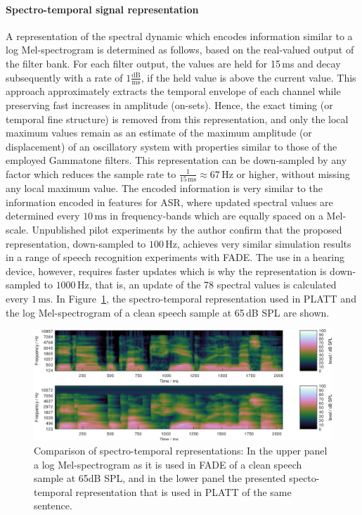 \documentclass[10pt,a4paper,twocolumn]{article}
\begin{document}
\paragraph{Spectro-temporal signal representation}
%
A representation of the spectral dynamic which encodes information similar to a log Mel-spectrogram is determined as follows, based on the real-valued output of the filter bank.
%
For each filter output, the values are held for 15\,ms and decay subsequently with a rate of $1\frac{\text{dB}}{\text{ms}}$, if the held value is above the current value.
%
This approach approximately extracts the temporal envelope of each channel while preserving fast increases in amplitude (on-sets).
%
Hence, the exact timing (or temporal fine structure) is removed from this representation, and only the local maximum values remain as an estimate of the maximum amplitude (or displacement) of an oscillatory system with properties similar to those of the employed Gammatone filters.
%
This representation can be down-sampled by any factor which reduces the sample rate to $\frac{1}{15\,\text{ms}}\approx67\,\text{Hz}$ or higher, without missing any local maximum value.
%
The encoded information is very similar to the information encoded in features for ASR, where updated spectral values are determined every $10\,\text{ms}$ in frequency-bands which are equally spaced on a Mel-scale.
%
Unpublished pilot experiments by the author confirm that the proposed representation, down-sampled to $100\,\text{Hz}$, achieves very similar simulation results in a range of speech recognition experiments with FADE.
%
The use in a hearing device, however, requires faster updates which is why the representation is down-sampled to $1000\,\text{Hz}$, that is, an update of the 78 spectral values is calculated every $1\,\text{ms}$.
%
In Figure~\ref{fig:8}, the spectro-temporal representation used in PLATT and the log Mel-spectrogram of a clean speech sample at 65\,dB SPL are shown.
%
\begin{figure}
	\centerline{\includegraphics[width=1.0\textwidth]{images/logms-plattstr}}
	\caption{Comparison of spectro-temporal representations: In the upper panel a log Mel-spectrogram as it is used in FADE of a clean speech sample at 65dB SPL, and in the lower panel the presented specto-temporal representation that is used in PLATT of the same sentence.}
	\label{fig:8}
\end{figure}
\end{document}
